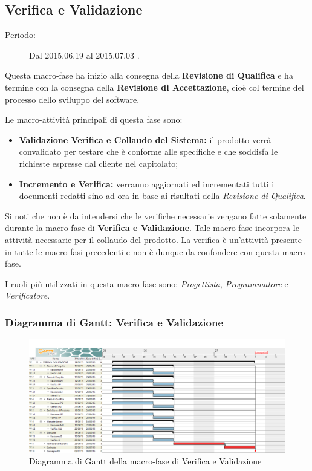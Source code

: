 \newpage
\subsection{Verifica e Validazione}
\begin{description}
	\item[Periodo:] Dal 2015.06.19 al 2015.07.03 .
\end{description}
Questa macro-fase ha inizio alla consegna della \textbf{Revisione di Qualifica} e ha termine con la consegna della \textbf{Revisione di Accettazione}, cioè col termine del processo dello sviluppo del software.

\noindent Le macro-attività principali di questa fase sono:
\begin{itemize}
	\item \textbf{Validazione Verifica e Collaudo del Sistema:} il prodotto verrà convalidato per testare che è conforme alle specifiche e che soddisfa le richieste espresse dal cliente nel capitolato;
	\item \textbf{Incremento e Verifica:} verranno aggiornati ed incrementati tutti i documenti redatti sino ad ora in base ai risultati della \textit{Revisione di Qualifica}.
\end{itemize}
Si noti che non è da intendersi che le verifiche necessarie vengano fatte solamente durante la macro-fase di \textbf{Verifica e Validazione}. Tale macro-fase incorpora le attività necessarie per il collaudo del prodotto. La verifica è un'attività presente in tutte le macro-fasi precedenti e non è dunque da confondere con questa macro-fase.

\noindent I ruoli più utilizzati in questa macro-fase sono: \textit{Progettista}, \textit{Programmatore} e \textit{Verificatore}.
\subsubsection{Diagramma di Gantt: Verifica e Validazione}
\begin{figure}[h] 
	\centering
	\includegraphics[width=\textwidth]{./img/verifica_validazione.png}
	\caption{Diagramma di Gantt della macro-fase di Verifica e Validazione}
\end{figure}

